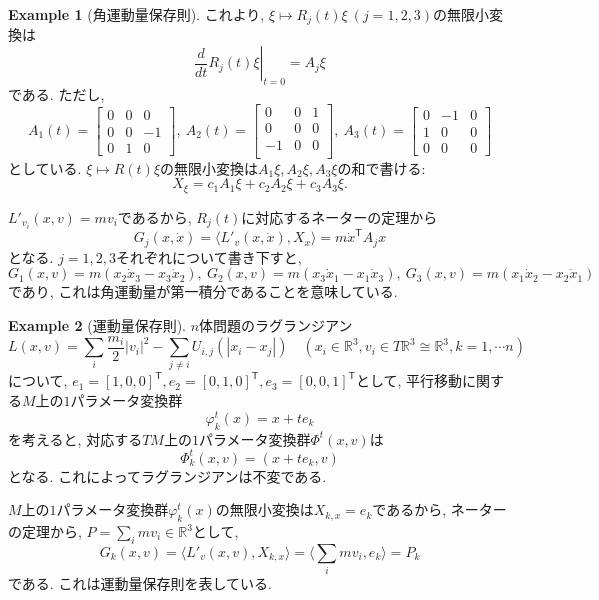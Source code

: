 \documentclass[a4paper]{ujarticle}
\numberwithin{equation}{section}
\theoremstyle{definition}
\newtheorem{example}{Example}
\begin{document}
\begin{example}[角運動量保存則]
        これより, $\xi \mapsto R_j(t) \xi \ (j = 1, 2, 3)$の無限小変換は
        \[
            \left. \frac{d}{dt} R_j(t) \xi \right|_{t = 0} = A_j \xi
        \]
        である. ただし,
        \[
            A_1(t) = 
            \begin{bmatrix}
                0 & 0 & 0 \\
                0 & 0 & - 1 \\
                0 & 1 & 0   
            \end{bmatrix}, 
            \ 
            A_2(t) = 
            \begin{bmatrix}
                0 & 0 & 1 \\
                0 & 0 & 0 \\
                -1 & 0 & 0 \\
            \end{bmatrix}, 
            \ 
            A_3(t) = 
            \begin{bmatrix}
                0 & - 1 & 0\\
                1 & 0 & 0\\
                0 & 0 & 0
            \end{bmatrix}
        \]
        としている.
        $\xi \mapsto R(t)\xi$の無限小変換は$A_1 \xi, A_2 \xi, A_3 \xi$の和で書ける:
        \[
            X_{\xi} = c_1 A_1 \xi + c_2 A_2 \xi +c_3 A_3 \xi.
        \]

        $L'_{v_i}(x, v) = m v_i $であるから, $R_j(t)$に対応するネーターの定理から
        \[
            G_j(x, \dot{x}) = \langle L'_v(x, \dot{x}), X_{x}\rangle = m \dot{x}^{\mathsf{T}} A_j x
        \]
        となる. $j = 1, 2, 3$それぞれについて書き下すと,
        \[
            G_1(x, v) = m (x_2 \dot{x}_3 - x_3 \dot{x}_2), \ 
            G_2(x, v) = m (x_3 \dot{x}_1 - x_1 \dot{x}_3), \ 
            G_3(x, v) = m (x_1 \dot{x}_2 - x_2 \dot{x}_1)
        \]
        であり, これは角運動量が第一積分であることを意味している.
    \end{example}

    \begin{example}[運動量保存則]
        $n$体問題のラグランジアン
        \[
            L(x, v) = \sum_{i} \frac{m_i}{2}|v_i|^2 - \sum_{j \neq i} U_{i, j}(|x_i - x_j|) \quad (x_i \in \mathbb{R}^3, v_i \in T \mathbb{R}^3 \cong \mathbb{R}^3, k = 1, \cdots n)
        \]
        について, $e_1 = [1, 0, 0]^{\mathsf{T}}, e_2 = [0, 1, 0]^{\mathsf{T}}, e_3 = [0, 0, 1]^{\mathsf{T}}$として,
        平行移動に関する$M$上の$1$パラメータ変換群
        \[
            \varphi^{t}_k(x) = x + t e_k
        \]
        を考えると, 対応する$TM$上の$1$パラメータ変換群$\Phi^{t}(x, v)$は
        \[
            \Phi^{t}_{k}(x, v) = (x + t e_k, v)
        \]
        となる. これによってラグランジアンは不変である.

        $M$上の$1$パラメータ変換群$\varphi^{t}_k(x)$の無限小変換は$X_{k, x} = e_k$であるから,
        ネーターの定理から, $P = \sum_{i} m v_i \in \mathbb{R}^3$として,
        \[
            G_k(x, v) = \langle L'_v(x, v), X_{k, x} \rangle = \langle \sum_{i} m v_i, e_k \rangle = P_k
        \]
        である. これは運動量保存則を表している.
    \end{example}
\end{document}
